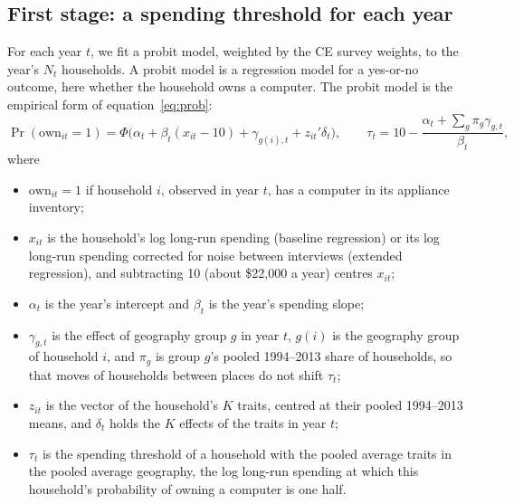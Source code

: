 \documentclass[11pt]{article}
\begin{document}
\subsection{First stage: a spending threshold for each year}
\label{sec:first}

For each year $t$, we fit a probit model, weighted by the CE survey weights, to the year's $N_t$ households. A probit model is a regression model for a yes-or-no outcome, here whether the household owns a computer. The probit model is the empirical form of equation~\eqref{eq:prob}:
\begin{equation}
\Pr(\text{own}_{it} = 1) = \Phi\big(\alpha_t + \beta_t (x_{it} - 10) + \gamma_{g(i),t} + z_{it}'\delta_t\big),
\qquad
\tau_t = 10 - \frac{\alpha_t + \sum_g \pi_g \gamma_{g,t}}{\beta_t},
\end{equation}
where
\begin{itemize}
\item $\text{own}_{it} = 1$ if household $i$, observed in year $t$, has a computer in its appliance inventory;
\item $x_{it}$ is the household's log long-run spending (baseline regression) or its log long-run spending corrected for noise between interviews (extended regression), and subtracting 10 (about \$22{,}000 a year) centres $x_{it}$;
\item $\alpha_t$ is the year's intercept and $\beta_t$ is the year's spending slope;
\item $\gamma_{g,t}$ is the effect of geography group $g$ in year $t$, $g(i)$ is the geography group of household $i$, and $\pi_g$ is group $g$'s pooled 1994--2013 share of households, so that moves of households between places do not shift $\tau_t$;
\item $z_{it}$ is the vector of the household's $K$ traits, centred at their pooled 1994--2013 means, and $\delta_t$ holds the $K$ effects of the traits in year $t$;
\item $\tau_t$ is the spending threshold of a household with the pooled average traits in the pooled average geography, the log long-run spending at which this household's probability of owning a computer is one half.
\end{itemize}
\end{document}
